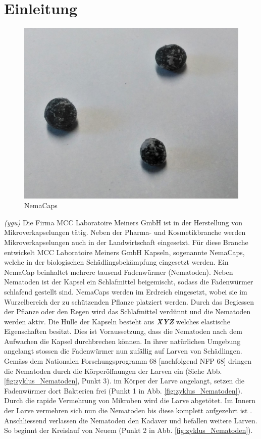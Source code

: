 \newpage
\section{Einleitung}
\begin{figure}
	\includegraphics[scale=0.18]{Illustrationen/3-Einleitung/nemacaps.jpg}
	\caption{NemaCaps}
	\label{fig:nemacaps}
\end{figure}
\textit{(ygu)} Die Firma MCC Laboratoire Meiners GmbH ist in der Herstellung von Mikroverkapselungen tätig. Neben der Pharma- und Kosmetikbranche werden Mikroverkapselungen auch in der Landwirtschaft eingesetzt. Für diese Branche entwickelt MCC Laboratoire Meiners GmbH Kapseln, sogenannte NemaCaps, welche in der biologischen Schädlingsbekämpfung eingesetzt werden. Ein NemaCap beinhaltet mehrere tausend Fadenwürmer (Nematoden). Neben Nematoden ist der Kapsel ein Schlafmittel beigemischt, sodass die Fadenwürmer schlafend gestellt sind. 
\newline
NemaCaps werden im Erdreich eingesetzt, wobei sie im Wurzelbereich der zu schützenden Pflanze platziert werden. Durch das Begiessen der Pflanze oder den Regen wird das Schlafmittel verdünnt und die Nematoden werden aktiv. Die Hülle der Kapseln besteht aus \textbf{\textit{XYZ}} welches elastische Eigenschaften besitzt. Dies ist Voraussetzung, dass die Nematoden nach dem Aufwachen die Kapsel durchbrechen können.\newline
In ihrer natürlichen Umgebung angelangt stossen die Fadenwürmer nun zufällig auf Larven von Schädlingen. Gemäss dem Nationalen Forschungsprogramm 68 [nachfolgend NFP 68]\cite{nfp} dringen die Nematoden durch die Körperöffnungen der Larven ein (Siehe Abb.  \ref{fig:zyklus_Nematoden}, Punkt 3). im Körper der Larve angelangt, setzen die Fadenwürmer dort Bakterien frei (Punkt 1 in Abb.  \ref{fig:zyklus_Nematoden}). Durch die rapide Vermehrung von Mikroben wird die Larve abgetötet. Im Innern der Larve vermehren sich nun die Nematoden bis diese komplett aufgezehrt ist \cite{nematoden}. Anschliessend verlassen die Nematoden den Kadaver und befallen weitere Larven. So beginnt der Kreislauf von Neuem (Punkt 2 in Abb.  \ref{fig:zyklus_Nematoden}).
\newline

